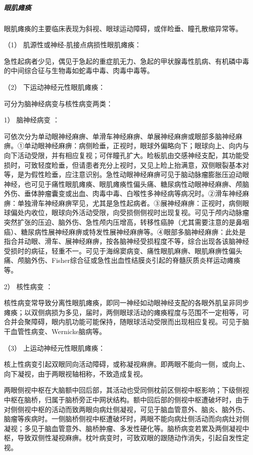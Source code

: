 \subparagraph{眼肌瘫痪}

眼肌瘫痪的主要临床表现为斜视、眼球运动障碍，或伴睑垂、瞳孔散缩异常等。

\hypertarget{text00018.htmlux5cux23CHP1-6-2-3-1-1}{}
（1） 肌源性或神经-肌接点病损性眼肌瘫痪：

急性起病者少见，偶见于急起的重症肌无力、急起的甲状腺毒性肌病、有机磷中毒的中间综合征与生物毒如蛇毒中毒、肉毒中毒等。

\hypertarget{text00018.htmlux5cux23CHP1-6-2-3-1-2}{}
（2） 下运动神经元性眼肌瘫痪：

可分为脑神经病变与核性病变两类：

\hypertarget{text00018.htmlux5cux23CHP1-6-2-3-1-2-1}{}
1） 脑神经病变 ：

可依次分为单动眼神经麻痹、单滑车神经麻痹、单展神经麻痹或眼部多脑神经麻痹。①单动眼神经麻痹：病侧睑垂，正视时，眼球外偏略向下；眼球向上、向内与向下活动受限，并有相应复视；可伴瞳孔扩大。睑板肌由交感神经支配，其功能受损时，可致轻度睑垂，但请患者充分上视时，又见上睑上抬满意，双侧眼裂基本对等，是为假性睑垂，应注意识别。急性动眼神经麻痹可见于脑动脉瘤膨胀压迫动眼神经，也可见于痛性眼肌瘫痪、眼肌瘫痪性偏头痛、糖尿病性动眼神经麻痹、颅脑外伤、垂体肿瘤囊变或出血、肉毒中毒、白喉性多神经病等病况时。②滑车神经麻痹：单独滑车神经麻痹罕见，尤其是急性起病者。③展神经麻痹：正视时，病侧眼球偏处内收位，眼球向外活动受限，向受损侧侧视时出现复视。可见于颅内动脉瘤突然扩张的压迫、脑外伤、急性颅内压增高，转移性癌肿（尤其需要注意的是鼻咽癌）、糖尿病性展神经麻痹或特发性展神经麻痹等。④眼部多脑神经麻痹：此处是指合并动眼、滑车、展神经麻痹，按各脑神经受损程度不等，综合出现各该脑神经受损时的病征，轻重不一。可见于海绵窦病变、痛性眼肌麻痹、眼肌麻痹性偏头痛、颅脑外伤、Fisher综合征或急性出血性结膜炎引起的脊髓灰质炎样运动瘫痪等。

\hypertarget{text00018.htmlux5cux23CHP1-6-2-3-1-2-2}{}
2） 核性病变 ：

核性病变常导致分离性眼肌瘫痪，即同一神经如动眼神经支配的各眼外肌呈非同步瘫痪；以双侧病损为多见，届时，两侧眼球活动的瘫痪程度与范围不一定相等，可合并会聚障碍，眼内肌功能可能保持，随眼球活动受限而出现相应复视。可见于脑干血管性病变、Wernicke脑病等。

\hypertarget{text00018.htmlux5cux23CHP1-6-2-3-1-3}{}
（3） 上运动神经元性眼肌瘫痪：

核上性病变引起双眼同向活动障碍，或称凝视麻痹。即两眼不能向一侧，或向上、向下凝视，由于两眼视轴相称，不致造成复视。

两眼侧视中枢在大脑额中回后部，其活动也受同侧枕前区侧视中枢影响；下级侧视中枢在脑桥，归属于脑桥旁正中网状结构。额中回后部的侧视中枢遭破坏时，由于对侧侧视中枢的活动而致两眼向病灶侧凝视，可见于脑血管意外、脑炎、脑外伤、脑瘤等疾病时。一侧脑桥侧视中枢遭破坏时，两眼不能向病灶侧活动而向病灶对侧凝视；多见于脑血管意外、脑桥肿瘤、多发性硬化等。脑桥病变若累及两侧凝视中枢，导致双侧性凝视麻痹。枕叶病变时，可致双眼的跟随动作消失，引起自发性定视。

